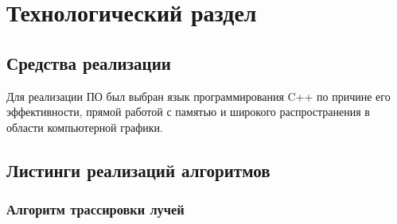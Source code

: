 \chapter{Технологический раздел}

\section{Средства реализации}

Для реализации ПО был выбран язык программирования C++ \cite{c++} по причине его эффективности, прямой работой с памятью и широкого распространения в области компьютерной графики.

\section{Листинги реализаций алгоритмов}

\subsection{Алгоритм трассировки лучей}

